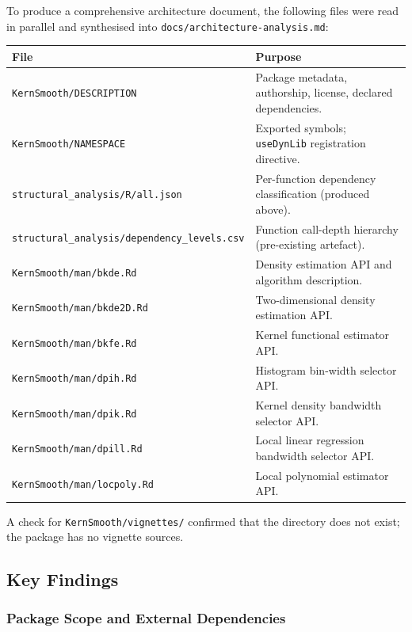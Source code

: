 \documentclass[12pt,a4paper]{article}
\begin{document}
To produce a comprehensive architecture document, the following files were read in parallel and synthesised into \texttt{docs/architecture-analysis.md}:

\begin{center}
\begin{tabular}{p{}p{}}
\toprule
File & Purpose \\
\midrule
\texttt{KernSmooth/DESCRIPTION} &
  Package metadata, authorship, license, declared dependencies. \\
\texttt{KernSmooth/NAMESPACE} &
  Exported symbols; \texttt{useDynLib} registration directive. \\
\texttt{structural\_analysis/R/all.json} &
  Per-function dependency classification (produced above). \\
\texttt{structural\_analysis/dependency\_levels.csv} &
  Function call-depth hierarchy (pre-existing artefact). \\
\texttt{KernSmooth/man/bkde.Rd} &
  Density estimation API and algorithm description. \\
\texttt{KernSmooth/man/bkde2D.Rd} &
  Two-dimensional density estimation API. \\
\texttt{KernSmooth/man/bkfe.Rd} &
  Kernel functional estimator API. \\
\texttt{KernSmooth/man/dpih.Rd} &
  Histogram bin-width selector API. \\
\texttt{KernSmooth/man/dpik.Rd} &
  Kernel density bandwidth selector API. \\
\texttt{KernSmooth/man/dpill.Rd} &
  Local linear regression bandwidth selector API. \\
\texttt{KernSmooth/man/locpoly.Rd} &
  Local polynomial estimator API. \\
\bottomrule
\end{tabular}
\end{center}

A check for \texttt{KernSmooth/vignettes/} confirmed that the directory does not exist; the package has no vignette sources.

\subsection{Key Findings}

\subsubsection{Package Scope and External Dependencies}
\end{document}
